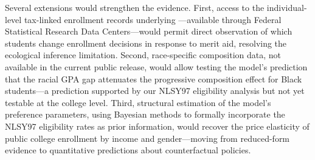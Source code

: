 Several extensions would strengthen the evidence. First, access to the
individual-level tax-linked enrollment records underlying
\textcite{chetty2020mobility}---available through Federal Statistical
Research Data Centers---would permit direct observation of which
students change enrollment decisions in response to merit aid,
resolving the ecological inference limitation. Second, race-specific
composition data, not available in the current public release, would
allow testing the model's prediction that the racial GPA gap
attenuates the progressive composition effect for Black students---a
prediction supported by our NLSY97 eligibility analysis but not yet
testable at the college level. Third, structural estimation of the
model's preference parameters, using Bayesian methods to formally
incorporate the NLSY97 eligibility rates as prior information, would
recover the price elasticity of public college enrollment by income
and gender---moving from reduced-form evidence to quantitative
predictions about counterfactual policies.
